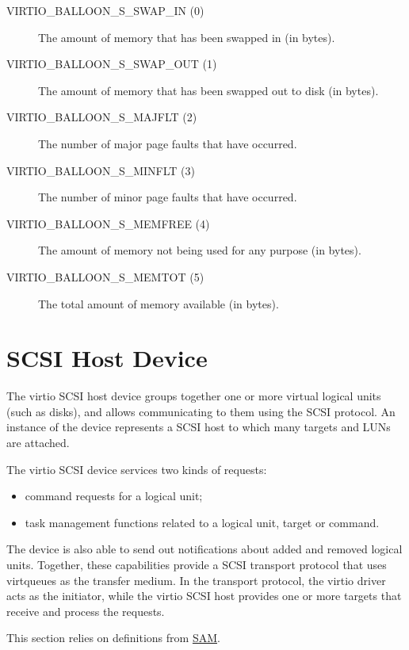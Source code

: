 \begin{description}
\item[VIRTIO_BALLOON_S_SWAP_IN (0)] The amount of memory that has been
  swapped in (in bytes).

\item[VIRTIO_BALLOON_S_SWAP_OUT (1)] The amount of memory that has been
  swapped out to disk (in bytes).

\item[VIRTIO_BALLOON_S_MAJFLT (2)] The number of major page faults that
  have occurred.

\item[VIRTIO_BALLOON_S_MINFLT (3)] The number of minor page faults that
  have occurred.

\item[VIRTIO_BALLOON_S_MEMFREE (4)] The amount of memory not being used
  for any purpose (in bytes).

\item[VIRTIO_BALLOON_S_MEMTOT (5)] The total amount of memory available
  (in bytes).
\end{description}

\section{SCSI Host Device}\label{sec:Device Types / SCSI Host Device}

The virtio SCSI host device groups together one or more virtual
logical units (such as disks), and allows communicating to them
using the SCSI protocol. An instance of the device represents a
SCSI host to which many targets and LUNs are attached.

The virtio SCSI device services two kinds of requests:
\begin{itemize}
\item command requests for a logical unit;

\item task management functions related to a logical unit, target or
  command.
\end{itemize}

The device is also able to send out notifications about added and
removed logical units. Together, these capabilities provide a
SCSI transport protocol that uses virtqueues as the transfer
medium. In the transport protocol, the virtio driver acts as the
initiator, while the virtio SCSI host provides one or more
targets that receive and process the requests.

This section relies on definitions from \hyperref[intro:SAM]{SAM}.

